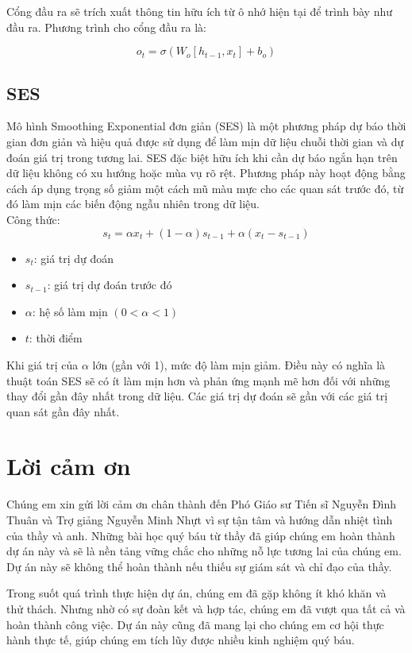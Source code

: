 \documentclass[conference]{IEEEtran}
\begin{document}
Cổng đầu ra sẽ trích xuất thông tin hữu ích từ ô nhớ hiện tại để trình bày như đầu ra. Phương trình cho cổng đầu ra là:

\begin{equation*}
    o_t = \sigma(W_o [h_{t-1}, x_t] + b_o)
\end{equation*}


\subsection{SES}
Mô hình Smoothing Exponential đơn giản (SES) là một phương pháp dự báo thời gian đơn giản và hiệu quả được sử dụng để làm mịn dữ liệu chuỗi thời gian và dự đoán giá trị trong tương lai. SES đặc biệt hữu ích khi cần dự báo ngắn hạn trên dữ liệu không có xu hướng hoặc mùa vụ rõ rệt. Phương pháp này hoạt động bằng cách áp dụng trọng số giảm một cách mũ màu mực cho các quan sát trước đó, từ đó làm mịn các biến động ngẫu nhiên trong dữ liệu.
\\
Công thức:
\begin{equation}
s_t = \alpha x_t + (1 - \alpha) s_{t-1} + \alpha (x_t - s_{t-1})
\end{equation}

\begin{itemize}
  \item $s_t$: giá trị dự đoán
  \item $s_{t-1}$: giá trị dự đoán trước đó
  \item $\alpha$: hệ số làm mịn $(0 < \alpha < 1)$
  \item $t$: thời điểm
\end{itemize}
Khi giá trị của \( \alpha \) lớn (gần với 1), mức độ làm mịn giảm. Điều này có nghĩa là thuật toán SES sẽ có ít làm mịn hơn và phản ứng mạnh mẽ hơn đối với những thay đổi gần đây nhất trong dữ liệu. Các giá trị dự đoán sẽ gần với các giá trị quan sát gần đây nhất.
\section*{Lời cảm ơn}


Chúng em xin gửi lời cảm ơn chân thành đến Phó Giáo sư Tiến sĩ Nguyễn Đình Thuân và Trợ giảng Nguyễn Minh Nhựt vì sự tận tâm và hướng dẫn nhiệt tình của thầy và anh. Những bài học quý báu từ thầy đã giúp chúng em hoàn thành dự án này và sẽ là nền tảng vững chắc cho những nỗ lực tương lai của chúng em. Dự án này sẽ không thể hoàn thành nếu thiếu sự giám sát và chỉ đạo của thầy.

Trong suốt quá trình thực hiện dự án, chúng em đã gặp không ít khó khăn và thử thách. Nhưng nhờ có sự đoàn kết và hợp tác, chúng em đã vượt qua tất cả và hoàn thành công việc. Dự án này cũng đã mang lại cho chúng em cơ hội thực hành thực tế, giúp chúng em tích lũy được nhiều kinh nghiệm quý báu.
\end{document}
